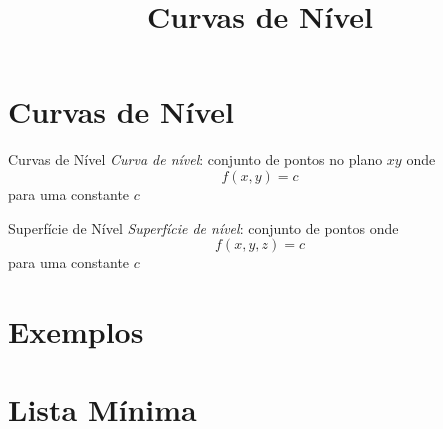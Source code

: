 
\usepackage{calculo_varias_variaveis-1}

\title{Curvas de Nível}



\addtitle

\section{Curvas de Nível}

\begin{frame}{Curvas de Nível}
  \emph{Curva de nível}: conjunto de pontos no plano $xy$ onde
  \[
    f(x, y) = c
  \]
  para uma constante $c$
\end{frame}

\begin{frame}{Superfície de Nível}
  \emph{Superfície de nível}: conjunto de pontos onde
  \[
  f(x, y, z) = c
  \]
  para uma constante $c$
\end{frame}


\section{Exemplos}



\section{Lista Mínima}

